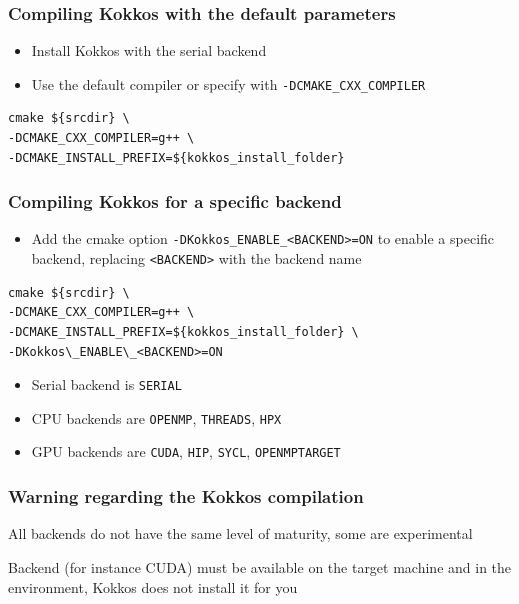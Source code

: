 \documentclass[aspectratio=169]{beamer}
\begin{document}

\begin{frame}[fragile]
    \frametitle{Compiling Kokkos with the default parameters} 

\begin{itemize}
    \item Install Kokkos with the serial backend
    \item Use the default compiler or specify with \texttt{-DCMAKE\_CXX\_COMPILER}
\end{itemize}

\begin{verbatim}
cmake ${srcdir} \
-DCMAKE_CXX_COMPILER=g++ \
-DCMAKE_INSTALL_PREFIX=${kokkos_install_folder}
\end{verbatim}

\end{frame}


\begin{frame}[fragile]
    \frametitle{Compiling Kokkos for a specific backend} 

\begin{itemize}
    \item Add the cmake option \texttt{-DKokkos\_ENABLE\_<BACKEND>=ON} to enable a specific backend, replacing \texttt{<BACKEND>} with the backend name
\end{itemize}
\small
\begin{verbatim}
cmake ${srcdir} \
-DCMAKE_CXX_COMPILER=g++ \ 
-DCMAKE_INSTALL_PREFIX=${kokkos_install_folder} \
-DKokkos\_ENABLE\_<BACKEND>=ON
\end{verbatim}
\normalsize
\begin{itemize}
    \item Serial backend is \texttt{SERIAL}
    \item CPU backends are \texttt{OPENMP}, \texttt{THREADS}, \texttt{HPX}
    \item GPU backends are \texttt{CUDA}, \texttt{HIP}, \texttt{SYCL}, \texttt{OPENMPTARGET}
\end{itemize}   

\end{frame}


\begin{frame}[fragile]
    \frametitle{Warning regarding the Kokkos compilation}

    \begin{alertblock}{}
        All backends do not have the same level of maturity, some are experimental
    \end{alertblock}

    \begin{alertblock}{}
        Backend (for instance CUDA) must be available on the target machine and in the environment, Kokkos does not install it for you
    \end{alertblock}

\end{frame}
\end{document}
